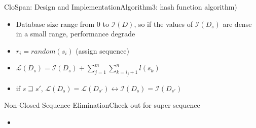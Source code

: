\documentclass[12pt]{beamer}
\begin{document}
\begin{frame}{CloSpan: Design and Implementation}{Algorithm3: hash function algorithm)}
\begin{itemize}
\item Database size range from 0 to $\mathcal{I}(D)$, so if the values of $\mathcal{I}(D_s)$ are dense in a small range, performance degrade
\item $r_i = random(s_i)$ (assign sequence)
\item $\mathcal{L}(D_s) = \mathcal{I}(D_s) + \sum^{m}_{j=1} \sum^{n}_{k=i_j+1}l(s_k)$
\item if $s \sqsupseteq s'$, $\mathcal{L}(D_s) = \mathcal{L}(D_{s'}) \leftrightarrow \mathcal{I}(D_s) = \mathcal{I}(D_{s'})$
\end{itemize}
\end{frame}

\begin{frame}{Non-Closed Sequence Elimination}{Check out for super sequence}
\begin{itemize}
\item 
\end{itemize}
\end{frame}
\end{document}
